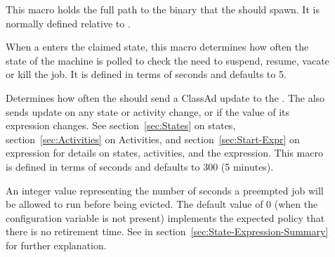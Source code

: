 \begin{description}

\item[] \label{param:Starter}  This macro holds the
  full path to the  binary that the  should 
  spawn.
  It is normally defined relative to .
  
\item[] \label{param:PollingInterval} When a
   enters the claimed state, this macro determines how often
  the state of the machine is polled to check the need to suspend, resume,
  vacate or kill the job.  It is defined in terms of seconds and defaults to
  5.
  
\item[] \label{param:UpdateInterval}
  Determines how often the  should send a ClassAd update
  to the .  The  also sends update on any
  state or activity change, or if the value of its  expression
  changes.  See section~\ref{sec:States} on 
  states, section~\ref{sec:Activities} on 
  Activities, and section~\ref{sec:Start-Expr} on 
   expression for details on states, activities, and the
   expression.  This macro is defined in
  terms of seconds and defaults to 300 (5 minutes).
  
\item[] \label{param:MaxJobRetirementTime}
  An integer value representing the number of seconds a preempted job
  will be allowed to run before being evicted. The default value of 0
  (when the configuration variable is not present) implements the
  expected policy that there is no retirement time.  See
   in
  section~\ref{sec:State-Expression-Summary} for further explanation.


\end{description}
